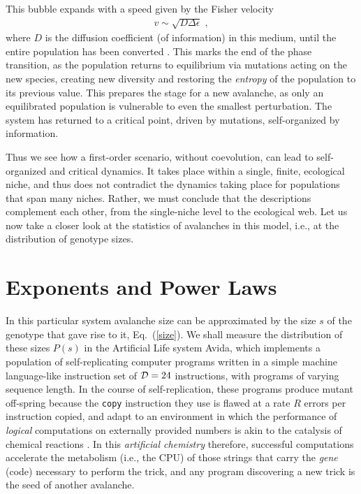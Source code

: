 \documentclass[letterpaper]{article}
\begin{document}
This bubble expands with a speed given by the Fisher velocity
\begin{eqnarray}
v\sim\sqrt{D\Delta\epsilon}\;, \label{eq4}
\end{eqnarray}
where $D$ is the diffusion coefficient (of information) in this
medium, until the entire population has been converted \citep{CHU}.
This marks the end of the phase transition, as the population returns
to equilibrium via mutations acting on the new species, creating new
diversity and restoring the {\em entropy} of the population to its
previous value. This prepares the stage for a new avalanche, as only
an equilibrated population is vulnerable to even the smallest
perturbation. The system has returned to a critical point, driven by
mutations, self-organized by information.

Thus we see how a first-order scenario, without coevolution, can lead
to self-organized and critical dynamics. It takes place within a
single, finite, ecological niche, and thus does not contradict the
dynamics taking place for populations that span many niches. Rather,
we must conclude that the descriptions complement each other, from the
single-niche level to the ecological web. Let us now take a closer
look at the statistics of avalanches in this model, i.e., at the
distribution of genotype sizes.


\section{Exponents and Power Laws}


In this particular system avalanche size can be approximated
by the size $s$ of the genotype that gave rise to it,
Eq.~(\ref{size}).  We shall measure the distribution of these sizes
$P(s)$ in the Artificial Life system Avida, which implements a
population of self-replicating computer programs written in a simple
machine language-like instruction set of ${\cal D}=24$ instructions,
with programs of varying sequence length. In the course of
self-replication, these programs produce mutant off-spring because the
{\tt copy} instruction they use is flawed at a rate $R$ errors per
instruction copied, and adapt to an environment in which the
performance of {\em logical} computations on externally provided
numbers is akin to the catalysis of chemical reactions \citep{OBA}. In
this {\em artificial chemistry} therefore, successful computations
accelerate the metabolism (i.e., the CPU) of those strings that carry
the {\em gene} (code) necessary to perform the trick, and any program
discovering a new trick is the seed of another avalanche.
\end{document}
